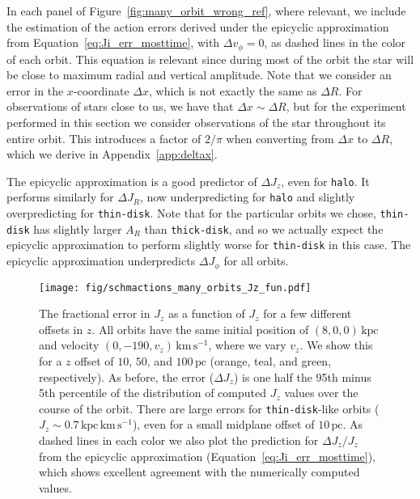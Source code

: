 \documentclass[twocolumn]{aastex62}
\newcommand{\pc}{\text{pc}}
\newcommand{\kpc}{\text{kpc}}
\newcommand{\kms}{\text{km}\,\text{s}^{-1}}
\newcommand{\actunit}{\text{kpc}\,\kms}
\newcommand{\thin}{\texttt{thin-disk}}
\newcommand{\thick}{\texttt{thick-disk}}
\newcommand{\halo}{\texttt{halo}}
\begin{document}
In each panel of Figure~\ref{fig:many_orbit_wrong_ref}, where relevant, we
include the estimation of the action errors derived under the epicyclic
approximation from Equation~\eqref{eq:Ji_err_mosttime}, with $\Delta
v_{\phi}=0$, as dashed lines in the color of each orbit. This equation is
relevant since during most of the orbit the star will be close to maximum
radial and vertical amplitude. Note that we consider an error in the
$x$-coordinate $\Delta x$, which is not exactly the same as $\Delta R$. For
observations of stars close to us, we have that $\Delta x \sim \Delta R$, but
for the experiment performed in this section we consider observations of the
star throughout its entire orbit. This introduces a factor of $2/\pi$ when
converting from $\Delta x$ to $\Delta R$, which we derive in
Appendix~\ref{app:deltax}.

The epicyclic approximation is a good predictor of $\Delta J_z$, even for \halo{}.
It performs similarly for $\Delta J_R$, now underpredicting for \halo{}
and slightly overpredicting for \thin{}. Note that for the
particular orbits we chose, \thin{} has slightly larger $A_R$ than
\thick{}, and so we actually expect the epicyclic approximation to perform
slightly worse for \thin{} in this case. The epicyclic approximation
underpredicts $\Delta J_{\phi}$ for all orbits.

\begin{figure}
\begin{center}
\texttt{[image: fig/schmactions\_many\_orbits\_Jz\_fun.pdf]}
\end{center}
\caption{The fractional error in $J_z$ as a function of $J_z$ for a few
different offsets in $z$. All orbits have the same initial position of $(8, 0,
0)\,\kpc$ and velocity $(0, -190, v_z)\,\kms$, where we vary
$v_z$. We show this for a $z$ offset of $10$, $50$,
and $100\,\pc$ (orange, teal, and green, respectively). As before, the error
($\Delta J_z$) is one half the 95th minus 5th percentile of the distribution
of computed $J_z$ values over the course of the orbit. There are large errors
for \thin{}-like orbits ($J_z \sim 0.7\,\actunit$), even for a small midplane
offset of $10\,\pc$. As dashed lines in each color we also plot the prediction
for $\Delta J_z/J_z$ from the epicyclic approximation
(Equation~\eqref{eq:Ji_err_mosttime}), which shows excellent agreement with
the numerically computed values.}
\label{fig:dJz_fun_Jz}
\end{figure}
\end{document}
